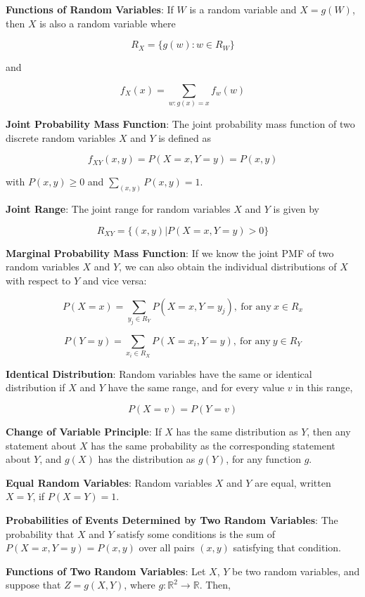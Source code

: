 \documentclass{article}
\begin{document}
\noindent\textbf{\color{orange}Functions of Random Variables}: If $W$ is a random variable and $X=g(W)$, then $X$ is also a random variable where

$$R_X=\{g(w):w\in R_W\}$$

and

$$f_X(x)=\underset{w:g(x)=x}{\sum}f_w(w)$$

\noindent\textbf{\color{blue}Joint Probability Mass Function}: The joint probability mass function of two discrete random variables $X$ and $Y$ is defined as

$$f_{XY}(x,y)=P(X=x,Y=y)=P(x,y)$$

with $P(x,y)\ge0$ and $\underset{(x,y)}{\sum}P(x,y)=1$.

\noindent\textbf{\color{blue}Joint Range}: The joint range for random variables $X$ and $Y$ is given by

$$R_{XY}=\{(x,y)|P(X=x,Y=y)>0\}$$

\noindent\textbf{\color{blue}Marginal Probability Mass Function}: If we know the joint PMF of two random variables $X$ and $Y$, we can also obtain the individual distributions of $X$ with respect to $Y$ and vice versa:

$$P(X=x)=\underset{y_j\in R_Y}{\sum}P(X=x,Y=y_j),\ \text{for any}\ x\in R_x$$

$$P(Y=y)=\underset{x_i\in R_X}{\sum}P(X=x_i,Y=y),\ \text{for any}\ y\in R_Y$$

\noindent\textbf{\color{red}Identical Distribution}: Random variables have the same or identical distribution if $X$ and $Y$ have the same range, and for every value $v$ in this range,

$$P(X=v)=P(Y=v)$$

\noindent\textbf{\color{red}Change of Variable Principle}: If $X$ has the same distribution as $Y$, then any statement about $X$ has the same probability as the corresponding statement about $Y$, and $g(X)$ has the distribution as $g(Y)$, for any function $g$.

\noindent\textbf{\color{red}Equal Random Variables}: Random variables $X$ and $Y$ are equal, written $X=Y$, if $P(X=Y)=1$.

\noindent\textbf{\color{orange}Probabilities of Events Determined by Two Random Variables}: The probability that $X$ and $Y$ satisfy some conditions is the sum of $P(X=x, Y=y)=P(x,y)$ over all pairs $(x,y)$ satisfying that condition.

\noindent\textbf{\color{orange}Functions of Two Random Variables}: Let $X$, $Y$ be two random variables, and suppose that $Z=g(X,Y)$, where $g:\mathbb{R}^2\rightarrow\mathbb{R}$. Then,
\end{document}
